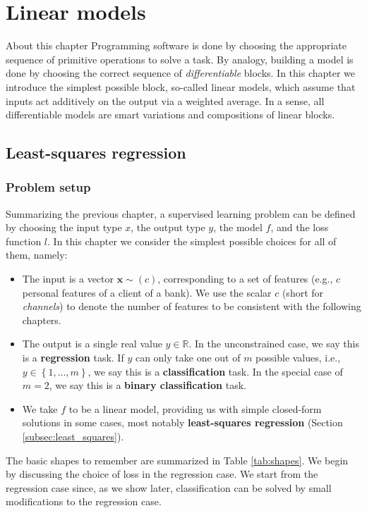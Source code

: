 \chapter{Linear models}
\label{chap:linear_models}

\begin{supportbox}{About this chapter}
Programming software is done by choosing the appropriate sequence of primitive operations to solve a task. By analogy, building a model is done by choosing the correct sequence of \textit{differentiable} blocks. In this chapter we introduce the simplest possible block, so-called linear models, which assume that inputs act additively on the output via a weighted average. In a sense, all differentiable models are smart variations and compositions of linear blocks.
\end{supportbox}

\section{Least-squares regression}

\subsection{Problem setup}

Summarizing the previous chapter, a supervised learning problem can be defined by choosing the input type $x$, the output type $y$, the model $f$, and the loss function $l$. In this chapter we consider the simplest possible choices for all of them, namely:
%
\begin{itemize}
    \item The input is a vector $\mathbf{x} \sim (c)$, corresponding to a set of features (e.g., $c$ personal features of a client of a bank). We use the scalar $c$ (short for \textit{channels}) to denote the number of features to be consistent with the following chapters.
    \item The output is a single real value $y \in \mathbb{R}$. In the unconstrained case, we say this is a \textbf{regression} task. If $y$ can only take one out of $m$ possible values, i.e., $y \in \left\{1, \ldots, m\right\}$, we say this is a \textbf{classification} task. In the special case of $m=2$, we say this is a \textbf{binary classification}  task.
    \item We take $f$ to be a linear model, providing us with simple closed-form solutions in some cases, most notably \textbf{least-squares regression} (Section \ref{subsec:least_squares}).
\end{itemize}
%
The basic shapes to remember are summarized in Table \ref{tab:shapes}. We begin by discussing the choice of loss in the regression case. We start from the regression case since, as we show later, classification can be solved by small modifications to the regression case.

